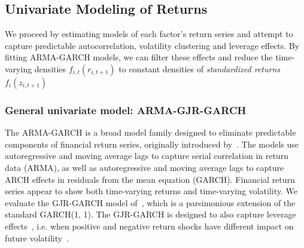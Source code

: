 
\subsection{Univariate Modeling of Returns} %
\label{sub:univariate_modeling_of_returns}

We proceed by estimating models of each factor's return series and attempt to capture predictable autocorrelation, volatility clustering and leverage effects. By fitting ARMA-GARCH models, we can filter these effects and reduce the time-varying densities $f_{i,t}(r_{i,t+1})$ to constant densities of \emph{standardized returns} $f_{i}(z_{i,t+1})$

\subsubsection{General univariate model: ARMA-GJR-GARCH}

The ARMA-GARCH is a broad model family designed to eliminate predictable components of financial return series, originally introduced by~\textcite{Bollerslev1986}. The models use autoregressive and moving average lags to capture serial correlation in return data (ARMA), as well as autoregressive and moving average lags to capture ARCH effects in residuals from the mean equation (GARCH). Financial return series appear to show both time-varying returns and time-varying volatility. We evaluate the GJR-GARCH model of~\textcite{glosten1993relation}, which is a parsimonious extension of the standard GARCH(1, 1). The GJR-GARCH is designed to also capture leverage effects~\autocite{glosten1993relation}, i.e. when positive and negative return shocks have different impact on future volatility~\autocite{Black1976}.

